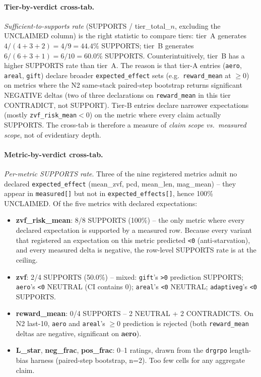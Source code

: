 \documentclass{article}
\begin{document}
\paragraph{Tier-by-verdict cross-tab.}
\textit{Sufficient-to-supports rate} (SUPPORTS / tier\_total\_$n$, excluding
the UNCLAIMED column) is the right statistic to compare tiers: tier~A
generates $4/(4+3+2) = 4/9 = 44.4\%$ SUPPORTS; tier~B generates
$6/(6+3+1) = 6/10 = 60.0\%$ SUPPORTS.
Counterintuitively, tier~B has a higher SUPPORTS rate than tier~A.  The
reason is that tier-A entries (\texttt{aero}, \texttt{areal}, \texttt{gift})
declare broader \texttt{expected\_effect} sets (e.g.\
\texttt{reward\_mean} at $\geq 0$) on metrics where the N2 same-stack
paired-step bootstrap returns significant NEGATIVE deltas (two of three
declarations on \texttt{reward\_mean} in this tier CONTRADICT, not
SUPPORT).  Tier-B entries declare narrower expectations (mostly
\texttt{zvf\_risk\_mean}$<0$) on the metric where every claim actually
SUPPORTS.  The cross-tab is therefore a measure of \emph{claim scope vs.\
measured scope}, not of evidentiary depth.

\paragraph{Metric-by-verdict cross-tab.}
\textit{Per-metric SUPPORTS rate}.  Three of the nine registered metrics
admit no declared \texttt{expected\_effect} (mean\_zvf, pcd, mean\_len,
mag\_mean) -- they appear in \texttt{measured[]} but not in
\texttt{expected\_effects[]}, hence 100\% UNCLAIMED.  Of the five metrics
with declared expectations:
\begin{itemize}
\item \textbf{zvf\_risk\_mean}: 8/8 SUPPORTS (100\%) -- the only
metric where every declared expectation is supported by a measured row.
Because every variant that registered an expectation on this metric
predicted \texttt{<0} (anti-starvation), and every measured delta is
negative, the row-level SUPPORTS rate is at the ceiling.
\item \textbf{zvf}: 2/4 SUPPORTS (50.0\%) -- mixed: \texttt{gift}'s
\texttt{>0} prediction SUPPORTS; \texttt{aero}'s \texttt{<0} NEUTRAL (CI
contains 0); \texttt{areal}'s \texttt{<0} NEUTRAL; \texttt{adaptiveg}'s
\texttt{<0} SUPPORTS.
\item \textbf{reward\_mean}: 0/4 SUPPORTS -- 2 NEUTRAL + 2 CONTRADICTS.
On N2 last-10, \texttt{aero} and \texttt{areal}'s $\geq 0$ prediction is
rejected (both \texttt{reward\_mean} deltas are negative, significant on
\textbf{aero}).
\item \textbf{L\_star}, \textbf{neg\_frac}, \textbf{pos\_frac}: 0--1
ratings, drawn from the \texttt{drgrpo} length-bias harness (paired-step
bootstrap, n=2).  Too few cells for any aggregate claim.
\end{itemize}
\end{document}

